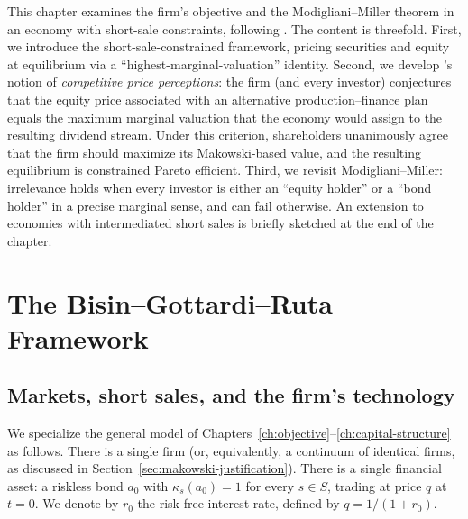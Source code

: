 \documentclass[11pt,a4paper,oneside]{book}
\theoremstyle{plain}
\theoremstyle{definition}
\theoremstyle{remark}
\numberwithin{equation}{chapter}
\begin{document}
This chapter examines the firm's objective and the Modigliani--Miller theorem in an economy with short-sale constraints, following \citet{BisinGottardiRuta2015}.
The content is threefold.
First, we introduce the short-sale-constrained framework, pricing securities and equity at equilibrium via a ``highest-marginal-valuation'' identity.
Second, we develop \citet{Makowski1983b}'s notion of \emph{competitive price perceptions}: the firm (and every investor) conjectures that the equity price associated with an alternative production--finance plan equals the maximum marginal valuation that the economy would assign to the resulting dividend stream.
Under this criterion, shareholders unanimously agree that the firm should maximize its Makowski-based value, and the resulting equilibrium is constrained Pareto efficient.
Third, we revisit Modigliani--Miller: irrelevance holds when every investor is either an ``equity holder'' or a ``bond holder'' in a precise marginal sense, and can fail otherwise.
An extension to economies with intermediated short sales is briefly sketched at the end of the chapter.

\section{The Bisin--Gottardi--Ruta Framework}
\label{sec:bgr-setup}

\subsection{Markets, short sales, and the firm's technology}

We specialize the general model of Chapters~\ref{ch:objective}--\ref{ch:capital-structure} as follows.
There is a single firm (or, equivalently, a continuum of identical firms, as discussed in Section~\ref{sec:makowski-justification}).
There is a single financial asset: a riskless bond $a_0$ with $\kappa_s(a_0) = 1$ for every $s \in S$, trading at price $q$ at $t=0$.
We denote by $r_0$ the risk-free interest rate, defined by $q = 1/(1 + r_0)$.
\end{document}
